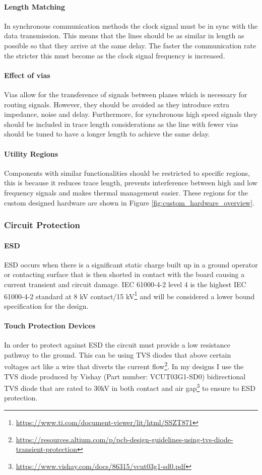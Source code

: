 \paragraph{Length Matching}
In synchronous communication methods the clock signal must be in sync with the data transmission. This means that the lines should be as similar in length as possible so that they arrive at the same delay. The faster the communication rate the stricter this must become as the clock signal frequency is increased.
\paragraph{Effect of vias}
Vias allow for the transference of signals between planes which is necessary for routing signals. However, they should be avoided as they introduce extra impedance, noise and delay. Furthermore, for synchronous high speed signals they should be included in trace length considerations as the line with fewer vias should be tuned to have a longer length to achieve the same delay.
\paragraph{Utility Regions}
Components with similar functionalities should be restricted to specific regions, this is because it reduces trace length, prevents interference between high and low frequency signals and makes thermal management easier. These regions for the custom designed hardware are shown in Figure \ref{fig:custom_hardware_overview}.

\subsubsection{Circuit Protection}\label{sub_sub_section:tgt_circuit_protection}
\paragraph{\gls{ESD}}
\gls{ESD} occurs when there is a significant static charge built up in a ground operator or contacting surface that is then shorted in contact with the board causing a current transient and circuit damage. IEC 61000-4-2 level 4 is the highest IEC 61000-4-2 standard at 8 kV contact/15 kV\footnote{\url{https://www.ti.com/document-viewer/lit/html/SSZT871}} and will be considered a lower bound specification for the design. 
\paragraph{Touch Protection Devices}
In order to protect against \gls{ESD} the circuit must provide a low resistance pathway to the ground. This can be using \gls{TVS} diodes that above certain voltages act like a wire that diverts the current flow\footnote{\url{https://resources.altium.com/p/pcb-design-guidelines-using-tvs-diode-transient-protection}}. In my designs I use the \gls{TVS} diode produced by Vishay (Part number: VCUT03G1-SD0) bidirectional \gls{TVS} diode that are rated to 30kV in both contact and air gap\footnote{\url{https://www.vishay.com/docs/86315/vcut03g1-sd0.pdf}} to ensure to \gls{ESD} protection. 

